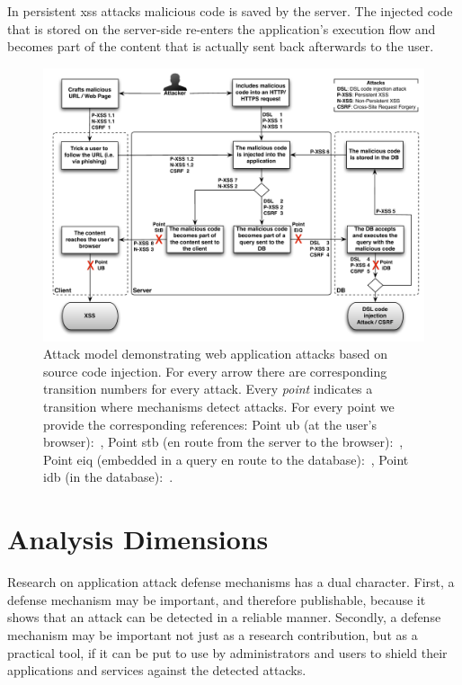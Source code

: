 \documentclass[conference]{IEEEtran}
\begin{document}
In persistent {\sc xss} attacks malicious code is saved by the server.
The injected code that is stored on the server-side re-enters the
application's execution flow and becomes part of the content that is
actually sent back afterwards to the user.

\begin{figure}
\begin{center}
\leavevmode
\includegraphics[scale=0.61]{attacks-steps-new.pdf}
\end{center}
\caption{\label{fig:attacks}Attack model demonstrating web
application attacks based on source code injection.
For every arrow there are corresponding transition numbers for
every attack. Every {\it point} indicates a transition where mechanisms
detect attacks. For every point we provide the corresponding
references:
Point {\sc ub} (at the user's browser):~\cite{KJKV09,LV09,TNH07,NSS06,APKLM10,ML10,YCIS07,PSC09,VDDPJ11,OWVS08,DDHPJ10,VFJKKV07,SLMS14,BV08},
Point {\sc s}t{\sc b} (en route from the server to the browser):~\cite{RDWDE07,JKK06a,GC09,JB07,NLC07,WPLKK09,JEP08,PS11},
Point {\sc e}i{\sc q} (embedded in a query en route to the database):~\cite{BWS05,SW06,HCF05,XBS06,PB05,PMP11,MS09,HO05,SMS13},
Point i{\sc db} (in the database):~\cite{BK04,LLW02,VMV05}.}
\end{figure}

\section{Analysis Dimensions}
\label{sec:dimensions}

Research on application attack defense mechanisms has a dual
character. First, a defense mechanism may be important, and therefore
publishable, because it shows that an attack can be detected in a
reliable manner. Secondly, a defense mechanism may be important not
just as a research contribution, but as a practical tool, if it can be
put to use by administrators and users to shield their applications
and services against the detected attacks.
\end{document}
